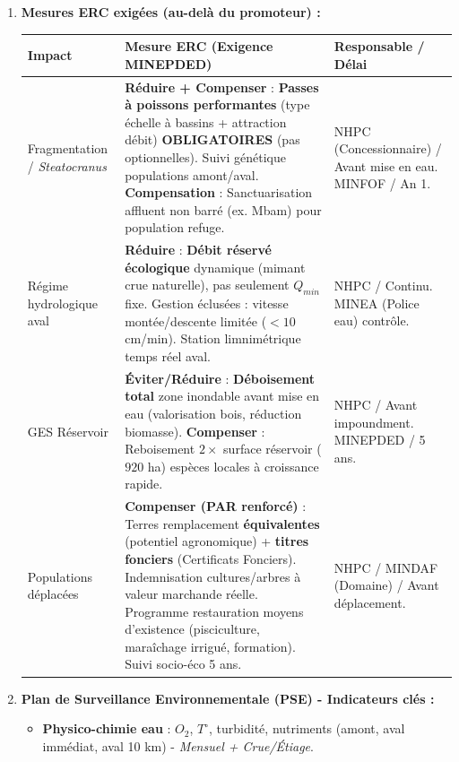 \documentclass[11pt]{article}
\begin{document}
\begin{exoresolu}
\begin{enumerate}
\begin{itemize}
        \end{itemize}
        \item \textbf{Mesures ERC exigées (au-delà du promoteur) :}
        \begin{center}
            \begin{tabularx}{\linewidth}{|l|X|l|}\hline
            \rowcolor{popblueL}
            \textbf{Impact} & \textbf{Mesure ERC (Exigence MINEPDED)} & \textbf{Responsable / Délai} \\ \hline
            Fragmentation / \emph{Steatocranus} & \textbf{Réduire + Compenser} : \textbf{Passes à poissons performantes} (type échelle à bassins + attraction débit) \textbf{OBLIGATOIRES} (pas optionnelles). Suivi génétique populations amont/aval. \textbf{Compensation} : Sanctuarisation affluent non barré (ex. Mbam) pour population refuge. & NHPC (Concessionnaire) / Avant mise en eau. MINFOF / An 1. \\ \hline
            Régime hydrologique aval & \textbf{Réduire} : \textbf{Débit réservé écologique} dynamique (mimant crue naturelle), pas seulement $Q_{min}$ fixe. Gestion éclusées : vitesse montée/descente limitée ($< 10$ cm/min). Station limnimétrique temps réel aval. & NHPC / Continu. MINEA (Police eau) contrôle. \\ \hline
            GES Réservoir & \textbf{Éviter/Réduire} : \textbf{Déboisement total} zone inondable avant mise en eau (valorisation bois, réduction biomasse). \textbf{Compenser} : Reboisement $2 \times$ surface réservoir ($920$ ha) espèces locales à croissance rapide. & NHPC / Avant impoundment. MINEPDED / 5 ans. \\ \hline
            Populations déplacées & \textbf{Compenser (PAR renforcé)} : Terres remplacement \textbf{équivalentes} (potentiel agronomique) + \textbf{titres fonciers} (Certificats Fonciers). Indemnisation cultures/arbres à valeur marchande réelle. Programme restauration moyens d'existence (pisciculture, maraîchage irrigué, formation). Suivi socio-éco 5 ans. & NHPC / MINDAF (Domaine) / Avant déplacement. \\ \hline
        \end{tabularx}
    \end{center}
        \item \textbf{Plan de Surveillance Environnementale (PSE) - Indicateurs clés :}
        \begin{itemize}
            \item \textbf{Physico-chimie eau} : $O_2$, $T^\circ$, turbidité, nutriments (amont, aval immédiat, aval 10 km) - \textit{Mensuel + Crue/Étiage}.

\end{itemize}
\end{enumerate}
\end{exoresolu}
\end{document}
